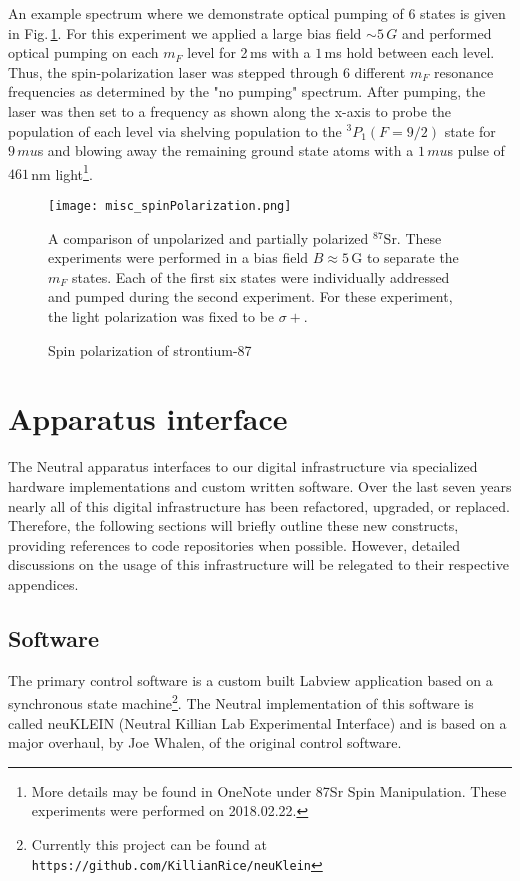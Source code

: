 An example spectrum where we demonstrate optical pumping of 6 states is given in Fig.\,\ref{fig:spinPolSpectra}. 
For this experiment we applied a large bias field $\sim5\,G$ and performed optical pumping on each $m_F$ level for 2\,ms with a $1\,$ms hold between each level.
Thus, the spin-polarization laser was stepped through 6 different $m_F$ resonance frequencies as determined by the "no pumping" spectrum.
After pumping, the laser was then set to a frequency as shown along the x-axis to probe the population of each level via shelving population to the $^3P_1 (F=9/2)$ state for $9\,mu$s and blowing away the remaining ground state atoms with a $1\,mu$s pulse of $461\,$nm light\footnote{More details may be found in OneNote under 87Sr Spin Manipulation. These experiments were performed on 2018.02.22.}.
	\begin{figure}
	\centerline{
		\texttt{[image: misc\_spinPolarization.png]}}
		\caption{Spin polarization of strontium-87}{A comparison of unpolarized and partially polarized $^{87}$Sr. These experiments were performed in a bias field $B\approx5\,$G to separate the $m_F$ states. Each of the first six states were individually addressed and pumped during the second experiment. For these experiment, the light polarization was fixed to be $\sigma+$.}
		 \label{fig:spinPolSpectra}
	\end{figure}



\newpage
\section{Apparatus interface} \label{sec:electronics}
\setcounter{footnote}{0}
The Neutral apparatus interfaces to our digital infrastructure via specialized hardware implementations and custom written software.
Over the last seven years nearly all of this digital infrastructure has been refactored, upgraded, or replaced.
Therefore, the following sections will briefly outline these new constructs, providing references to code repositories when possible.
However, detailed discussions on the usage of this infrastructure will be relegated to their respective appendices.

\subsection{Software} \label{ssec:soft_sys}
The primary control software is a custom built Labview application based on a synchronous state machine\footnote{Currently this project can be found at \texttt{https://github.com/KillianRice/neuKlein}}.
The Neutral implementation of this software is called neuKLEIN (Neutral Killian Lab Experimental Interface) and is based on a major overhaul, by Joe Whalen, of the original control software.

